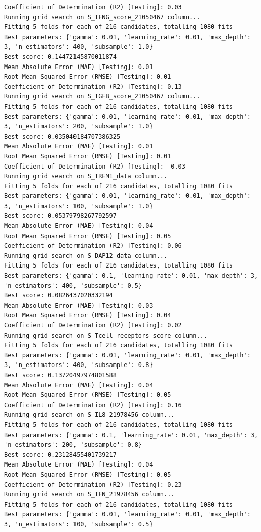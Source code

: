 \documentclass[
  letterpaper,
  DIV=11,
  numbers=noendperiod]{scrartcl}
\begin{document}
\begin{verbatim}
Coefficient of Determination (R2) [Testing]: 0.03
Running grid search on S_IFNG_score_21050467 column...
Fitting 5 folds for each of 216 candidates, totalling 1080 fits
Best parameters: {'gamma': 0.01, 'learning_rate': 0.01, 'max_depth': 3, 'n_estimators': 400, 'subsample': 1.0}
Best score: 0.14472145870011874
Mean Absolute Error (MAE) [Testing]: 0.01
Root Mean Squared Error (RMSE) [Testing]: 0.01
Coefficient of Determination (R2) [Testing]: 0.13
Running grid search on S_TGFB_score_21050467 column...
Fitting 5 folds for each of 216 candidates, totalling 1080 fits
Best parameters: {'gamma': 0.01, 'learning_rate': 0.01, 'max_depth': 3, 'n_estimators': 200, 'subsample': 1.0}
Best score: 0.035040184707386325
Mean Absolute Error (MAE) [Testing]: 0.01
Root Mean Squared Error (RMSE) [Testing]: 0.01
Coefficient of Determination (R2) [Testing]: -0.03
Running grid search on S_TREM1_data column...
Fitting 5 folds for each of 216 candidates, totalling 1080 fits
Best parameters: {'gamma': 0.01, 'learning_rate': 0.01, 'max_depth': 3, 'n_estimators': 100, 'subsample': 1.0}
Best score: 0.05379798267792597
Mean Absolute Error (MAE) [Testing]: 0.04
Root Mean Squared Error (RMSE) [Testing]: 0.05
Coefficient of Determination (R2) [Testing]: 0.06
Running grid search on S_DAP12_data column...
Fitting 5 folds for each of 216 candidates, totalling 1080 fits
Best parameters: {'gamma': 0.1, 'learning_rate': 0.01, 'max_depth': 3, 'n_estimators': 400, 'subsample': 0.5}
Best score: 0.0826437020332194
Mean Absolute Error (MAE) [Testing]: 0.03
Root Mean Squared Error (RMSE) [Testing]: 0.04
Coefficient of Determination (R2) [Testing]: 0.02
Running grid search on S_Tcell_receptors_score column...
Fitting 5 folds for each of 216 candidates, totalling 1080 fits
Best parameters: {'gamma': 0.01, 'learning_rate': 0.01, 'max_depth': 3, 'n_estimators': 400, 'subsample': 0.8}
Best score: 0.13720497974801588
Mean Absolute Error (MAE) [Testing]: 0.04
Root Mean Squared Error (RMSE) [Testing]: 0.05
Coefficient of Determination (R2) [Testing]: 0.16
Running grid search on S_IL8_21978456 column...
Fitting 5 folds for each of 216 candidates, totalling 1080 fits
Best parameters: {'gamma': 0.1, 'learning_rate': 0.01, 'max_depth': 3, 'n_estimators': 200, 'subsample': 0.8}
Best score: 0.23128455401739217
Mean Absolute Error (MAE) [Testing]: 0.04
Root Mean Squared Error (RMSE) [Testing]: 0.05
Coefficient of Determination (R2) [Testing]: 0.23
Running grid search on S_IFN_21978456 column...
Fitting 5 folds for each of 216 candidates, totalling 1080 fits
Best parameters: {'gamma': 0.01, 'learning_rate': 0.01, 'max_depth': 3, 'n_estimators': 100, 'subsample': 0.5}

\end{verbatim}
\end{document}
